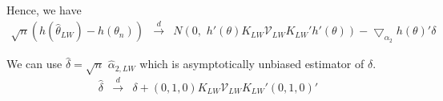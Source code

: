 	Hence, we have
	\begin{eqnarray}
 			\sqrt{n} (h(\widehat{\theta}_{LW})-h(\theta_n)) &\overset{d}{\rightarrow}&  			N\left(0,\,\, h'(\theta)K_{LW}\mathcal{V}_{LW}K_{LW}'h'(\theta) \right) -\bigtriangledown_{\alpha_2} h(\theta)'\delta 
	\end{eqnarray}
	
	We can use $\widehat{\delta} = \sqrt{n}\,\, \widehat{\alpha}_{2, LW}$ which is asymptotically unbiased estimator of $\delta$.	
\begin{eqnarray}
 			\widehat{\delta} &\overset{d}{\rightarrow}& \delta + (0, 1, 0)K_{LW} \mathcal{V}_{LW} K_{LW}'(0, 1, 0)'	  			
	\end{eqnarray}	
	
